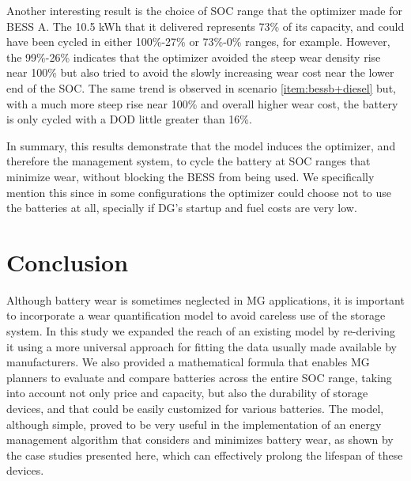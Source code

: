 \documentclass{ieeeaccess}
\begin{document}
    Another interesting result is the choice of \ac{SOC} range that the optimizer made for \ac{BESS} A. The 10.5 kWh that it delivered represents 73\% of its capacity, and could have been cycled in either 100\%-27\% or 73\%-0\% ranges, for example. However, the 99\%-26\% indicates that the optimizer avoided the steep wear density rise near 100\% but also tried to avoid the slowly increasing wear cost near the lower end of the \ac{SOC}. The same trend is observed in scenario \ref{item:bessb+diesel} but, with a much more steep rise near 100\% and overall higher wear cost, the battery is only cycled with a \ac{DOD} little greater than 16\%.

    In summary, this results demonstrate that the model induces the optimizer, and therefore the management system, to cycle the battery at \ac{SOC} ranges that minimize wear, without blocking the \ac{BESS} from being used. We specifically mention this since in some configurations the optimizer could choose not to use the batteries at all, specially if \ac{DG}'s startup and fuel costs are very low.

    \section{Conclusion}
    Although battery wear is sometimes neglected in \ac{MG} applications, it is important to incorporate a wear quantification model to avoid careless use of the storage system. In this study we expanded the reach of an existing model by re-deriving it using a more universal approach for fitting the data usually made available by manufacturers. We also provided a mathematical formula that enables \ac{MG} planners to evaluate and compare batteries across the entire \ac{SOC} range, taking into account not only price and capacity, but also the durability of storage devices, and that could be easily customized for various batteries. The model, although simple, proved to be very useful in the implementation of an energy management algorithm that considers and minimizes battery wear, as shown by the case studies presented here, which can effectively prolong the lifespan of these devices.

    
    
\end{document}
